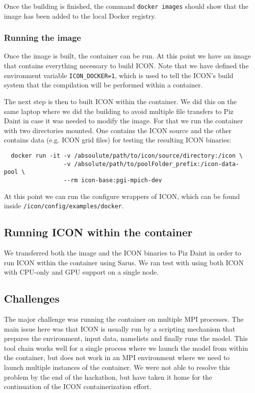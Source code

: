 \documentclass{article}
\begin{document}
Once the building is finished, the command \verb$docker images$ should show that the image has been added to the local Docker registry.

\subsubsection{Running the image}

Once the image is built, the container can be run.
At this point we have an image that contains everything necessary to build ICON. Note that we have defined the environment
variable \verb$ICON_DOCKER=1$, which is used to tell the ICON's build system that the compilation will be performed within a container.

The next step is then to built ICON within the container.
We did this on the same laptop where we did the building to avoid multiple file transfers
to Piz Daint in case it was needed to modify the image.
For that we run the container with two directories mounted. One contains the ICON source and the other contains
data (e.g. ICON grid files) for testing the resulting ICON binaries:
\begin{verbatim}
  docker run -it -v /absoulute/path/to/icon/source/directory:/icon \
                 -v /absolute/path/to/poolFolder_prefix:/icon-data-pool \
                 --rm icon-base:pgi-mpich-dev
\end{verbatim}
\noindent
At this point we can run the configure wrappers of ICON, which can be found inside \verb$/icon/config/examples/docker$.

\subsection{Running ICON within the container}
We transferred both the image and the ICON binaries to Piz Daint in order to run ICON within the container using Sarus.
We ran test with using both ICON with CPU-only and GPU support on a single node.

\subsection{Challenges}
The major challenge was running the container on multiple MPI processes. The main issue here was that ICON is usually run by a scripting mechanism that prepares the environment, input data, namelists and finally runs the model. This tool chain works well for a single process where we launch the model from within the container, but does not work in an MPI environment where we need to launch multiple instances of the container.   We were not able to resolve this problem by the end of the hackathon, but have taken it home for the continuation of the ICON containerization effort.
\end{document}
